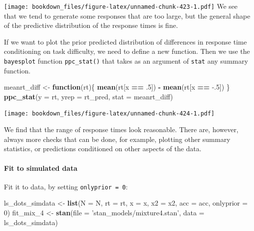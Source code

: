 \documentclass[12pt,]{krantz}
\newenvironment{Shaded}{\begin{snugshade}}{\end{snugshade}}
\newcommand{\ControlFlowTok}[1]{\textcolor[rgb]{0.13,0.29,0.53}{\textbf{#1}}}
\newcommand{\DataTypeTok}[1]{\textcolor[rgb]{0.13,0.29,0.53}{#1}}
\newcommand{\DecValTok}[1]{\textcolor[rgb]{0.00,0.00,0.81}{#1}}
\newcommand{\FloatTok}[1]{\textcolor[rgb]{0.00,0.00,0.81}{#1}}
\newcommand{\KeywordTok}[1]{\textcolor[rgb]{0.13,0.29,0.53}{\textbf{#1}}}
\newcommand{\NormalTok}[1]{#1}
\newcommand{\OperatorTok}[1]{\textcolor[rgb]{0.81,0.36,0.00}{\textbf{#1}}}
\newcommand{\StringTok}[1]{\textcolor[rgb]{0.31,0.60,0.02}{#1}}
\let\oldparagraph\paragraph
\renewcommand{\paragraph}[1]{\oldparagraph{#1}\mbox{}}
\theoremstyle{definition}
\theoremstyle{definition}
\theoremstyle{definition}
\theoremstyle{remark}
\begin{document}
\texttt{[image: bookdown\_files/figure-latex/unnamed-chunk-423-1.pdf]}
We see that we tend to generate some responses that are too large, but the general shape of the predictive distribution of the response times is fine.

If we want to plot the prior predicted distribution of differences in response time conditioning on task difficulty, we need to define a new function. Then we use the \texttt{bayesplot} function \texttt{ppc\_stat()} that takes as an argument of \texttt{stat} any summary function.

\begin{Shaded}
\begin{Highlighting}[]
\NormalTok{meanrt_diff <-}\StringTok{ }\ControlFlowTok{function}\NormalTok{(rt)\{}
  \KeywordTok{mean}\NormalTok{(rt[x }\OperatorTok{==}\StringTok{ }\FloatTok{.5}\NormalTok{]) }\OperatorTok{-}\StringTok{ }\KeywordTok{mean}\NormalTok{(rt[x }\OperatorTok{==}\StringTok{ }\FloatTok{-.5}\NormalTok{])}
\NormalTok{\}}
\KeywordTok{ppc_stat}\NormalTok{(}\DataTypeTok{y =}\NormalTok{ rt, }\DataTypeTok{yrep =}\NormalTok{ rt_pred, }\DataTypeTok{stat =}\NormalTok{ meanrt_diff) }
\end{Highlighting}
\end{Shaded}

\texttt{[image: bookdown\_files/figure-latex/unnamed-chunk-424-1.pdf]}

We find that the range of response times look reasonable. There are, however, always more checks that can be done, for example, plotting other summary statistics, or predictions conditioned on other aspects of the data.

\hypertarget{fit-to-simulated-data}{%
\paragraph{Fit to simulated data}\label{fit-to-simulated-data}}

Fit it to data, by setting \texttt{onlyprior\ =\ 0}:

\begin{Shaded}
\begin{Highlighting}[]
\NormalTok{ls_dots_simdata <-}\StringTok{ }\KeywordTok{list}\NormalTok{(}\DataTypeTok{N =}\NormalTok{ N,}
                        \DataTypeTok{rt =}\NormalTok{ rt,}
                        \DataTypeTok{x =}\NormalTok{ x,}
                        \DataTypeTok{x2 =}\NormalTok{ x2,}
                        \DataTypeTok{acc =}\NormalTok{ acc,}
                        \DataTypeTok{onlyprior =} \DecValTok{0}\NormalTok{) }
\NormalTok{fit_mix_}\DecValTok{4}\NormalTok{ <-}\StringTok{ }\KeywordTok{stan}\NormalTok{(}\DataTypeTok{file =} \StringTok{'stan_models/mixture4.stan'}\NormalTok{,}
                  \DataTypeTok{data =}\NormalTok{ ls_dots_simdata) }
\end{Highlighting}
\end{Shaded}
\end{document}
